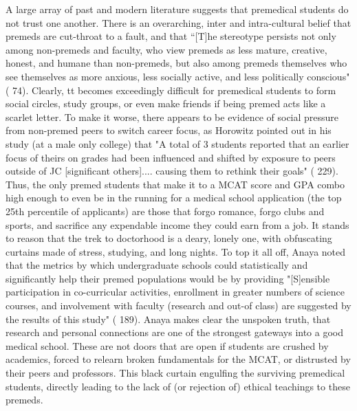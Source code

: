 \documentclass [12pt]{article}
\begin{document}
\begin{flushleft}
A large array of past and modern literature suggests that premedical students do not trust one another. There is an overarching, inter and intra-cultural belief that premeds are cut-throat to a fault, and that {``}[T]he stereotype persists not only among non-premeds and faculty, who view premeds as less mature, creative, honest, and humane than non-premeds, but also among premeds themselves who see themselves as more anxious, less socially active, and less politically conscious" (\cite{Olsen-2016} 74). Clearly, tt becomes exceedingly difficult for premedical students to form social circles, study groups, or even make friends if being premed acts like a scarlet letter. To make it worse, there appears to be evidence of social pressure from non-premed peers to switch career focus, as Horowitz pointed out in his study (at a male only college) that "A total of 3 students reported that an earlier focus of theirs on grades had been influenced and shifted by exposure to peers outside of JC [significant others].... causing them to rethink their goals" (\cite{Horowitz-2010} 229). Thus, the only premed students that make it to a MCAT score and GPA combo high enough to even be in the running for a medical school application (the top 25th percentile of applicants) are those that forgo romance, forgo clubs and sports, and sacrifice any expendable income they could earn from a job. It stands to reason that the trek to doctorhood is a deary, lonely one, with obfuscating curtains made of stress, studying, and long nights. To top it all off, Anaya noted that the metrics by which undergraduate schools could statistically and significantly help their premed populations would be by providing "[S]ensible participation in co-curricular activities, enrollment in greater numbers of science courses, and involvement with faculty (research and out-of class) are suggested by the results of this study" (\cite{Anaya-2001} 189).
Anaya makes clear the unspoken truth, that research and personal connections are one of the strongest gateways into a good medical school. These are not doors that are open if students are crushed by academics, forced to relearn broken fundamentals for the MCAT, or distrusted by their peers and professors. This black curtain engulfing the surviving premedical students, directly leading to the lack of (or rejection of) ethical teachings to these premeds.


\end{flushleft}
\end{document}

